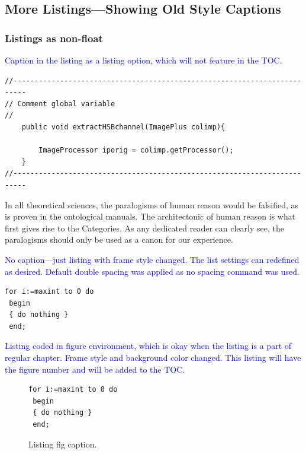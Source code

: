 \documentclass[phd]{ndsu-thesis-2022}
\newcommand\italk[1]{\textcolor{blue}{#1}}  %
\begin{document}
\subsection{More Listings---Showing Old Style Captions}

\subsubsection{Listings as non-float}

\italk{Caption in the listing as a listing option, which will not feature in the TOC.}

{\singlespacing
\begin{lstlisting}[frameround=fttt, caption = {Caption in listing as option.}, captionpos=b]
//-------------------------------------------------------------------------
// Comment global variable
//
	public void extractHSBchannel(ImagePlus colimp){

		ImageProcessor iporig = colimp.getProcessor();
	}	
//-------------------------------------------------------------------------	
\end{lstlisting}
}

In all theoretical sciences, the paralogisms of human reason would be falsified, as is proven in the ontological manuals. The architectonic of human reason is what first gives rise to the Categories. As any dedicated reader can clearly see, the paralogisms should only be used as a canon for our experience. 

\italk{No caption---just listing with frame style changed. The list settings can redefined as desired. Default double spacing was applied as no spacing command was used.}
\vspace{3mm}

\lstset{frameround=fttt}
\begin{lstlisting}[frame=trBL, caption={}]
 for i:=maxint to 0 do
 begin
 { do nothing }
 end;
\end{lstlisting}

\kant[9]
\italk{Listing coded in figure environment, which is okay when the listing is a part of regular chapter. Frame style and background color changed. This listing will have the figure number and will be added to the TOC.}

\begin{figure}[ht!]
{\singlespacing
\lstset{frameround=fttt}
\begin{lstlisting}[frame=trBL, backgroundcolor=\color{blue!10!white}]
 for i:=maxint to 0 do
 begin
 { do nothing }
 end;
\end{lstlisting}
}
\caption{Listing fig caption.}
\end{figure}
\end{document}
